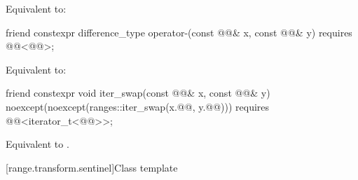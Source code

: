 \begin{itemdescr}
\pnum
\effects
Equivalent to: 
\end{itemdescr}

%
\begin{itemdecl}
friend constexpr difference_type operator-(const @@& x, const @@& y)
  requires @@<@@>;
\end{itemdecl}

\begin{itemdescr}
\pnum
\effects
Equivalent to: 
\end{itemdescr}

%
\begin{itemdecl}
friend constexpr void iter_swap(const @@& x, const @@& y)
  noexcept(noexcept(ranges::iter_swap(x.@@, y.@@)))
  requires @@<iterator_t<@@>>;
\end{itemdecl}

\begin{itemdescr}
\pnum
\effects
Equivalent to .
\end{itemdescr}


[range.transform.sentinel]{Class template }

